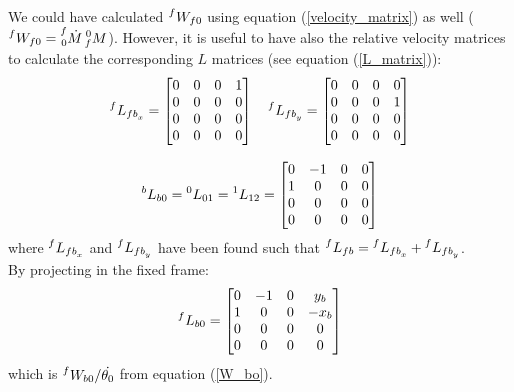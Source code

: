 \documentclass[a4paper,12pt,oneside]{report}
\begin{document}
\\
We could have calculated $\prescript{f}{}{W_{f0}}$ using equation (\ref{velocity_matrix}) as well ($\prescript{f}{}{W_{f0}}=\prescript{f}{0}{\dot{M}}\prescript{0}{f}{M}$). However, it is useful to have also the relative velocity matrices to calculate the corresponding $L$ matrices (see equation (\ref{L_matrix})):
\begin{equation}
  \begin{array}{c}
    \prescript{f}{}{L_{{fb}_x}}=\begin{bmatrix}
      0&0&0&1\\
      0&0&0&0\\
      0&0&0&0\\
      0&0&0&0
    \end{bmatrix} \quad
    \prescript{f}{}{L_{{fb}_y}}=\begin{bmatrix}
      0&0&0&0\\
      0&0&0&1\\
      0&0&0&0\\
      0&0&0&0
    \end{bmatrix}\\ \\
    \prescript{b}{}{L_{b0}}=\prescript{0}{}{L_{01}}=\prescript{1}{}{L_{12}}=\begin{bmatrix}
      0&-1&0&0\\
      1&0&0&0\\
      0&0&0&0\\
      0&0&0&0
    \end{bmatrix}
  \end{array}
  \label{L_matrices}
\end{equation}
where $\prescript{f}{}{L_{{fb}_x}}$ and $\prescript{f}{}{L_{{fb}_y}}$ have been found such that $\prescript{f}{}{L_{fb}}=\prescript{f}{}{L_{{fb}_x}}+\prescript{f}{}{L_{{fb}_y}}$.\\
By projecting in the fixed frame:
\begin{equation}
  \prescript{f}{}{L_{b0}}=\begin{bmatrix}
    0&-1&0&y_b\\
    1&0&0&-x_b\\
    0&0&0&0\\
    0&0&0&0
  \end{bmatrix}
\end{equation}
which is $\prescript{f}{}{W_{b0}}/ \dot{\theta_0}$ from equation (\ref{W_bo}).
\end{document}
